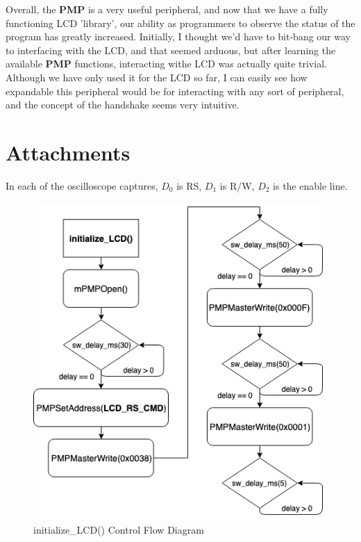 \documentclass[a4paper, 12pt]{article}
\begin{document}
Overall, the \textbf{PMP} is a very useful peripheral, and now that we have a fully functioning LCD 'library', our ability as programmers to observe the status of the program has greatly increased. Initially, I thought we'd have to bit-bang our way to interfacing with the LCD, and that seemed arduous, but after learning the available \textbf{PMP} functions, interacting withe LCD was actually quite trivial. Although we have only used it for the LCD so far, I can easily see how expandable this peripheral would be for interacting with any sort of peripheral, and the concept of the handshake seems very intuitive.

\section{Attachments}
In each of the oscilloscope captures, $D_0$ is RS, $D_1$ is R/W, $D_2$ is the enable line.
\begin{figure}[htb]
\centering
\includegraphics[width=.8\textwidth]{initialize_LCD_CFD.png}
\caption{initialize\_LCD() Control Flow Diagram}
\end{figure}
\end{document}

